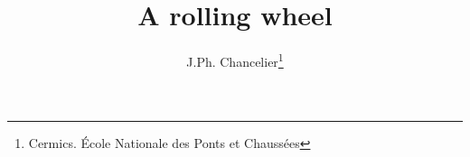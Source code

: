 
             \textheight=660pt 
             \textwidth=15cm
             \topmargin=-27pt 
             \oddsidemargin=0.7cm
             \evensidemargin=0.7cm
             \marginparwidth=60pt
             \title{A rolling wheel} 
             \author{J.Ph. Chancelier\thanks{Cermics. \'Ecole Nationale des Ponts et Chauss\'ees}}
	
\maketitle
\def\LL(#1){ {d\over dt}  \left({\partial {\cal L} \over
\dot{#1}}\right) - {\partial {\cal L} \over #1 }}
 


